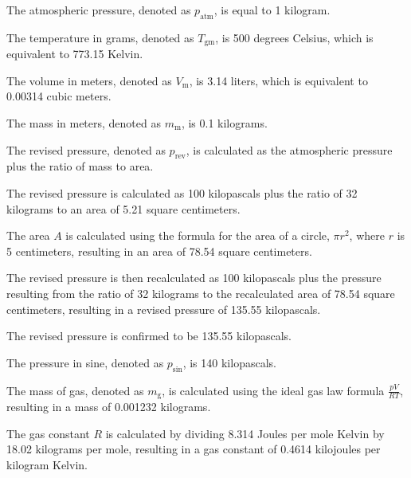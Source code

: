 The atmospheric pressure, denoted as \( p_{\text{atm}} \), is equal to 1 kilogram.

The temperature in grams, denoted as \( T_{\text{gm}} \), is 500 degrees Celsius, which is equivalent to 773.15 Kelvin.

The volume in meters, denoted as \( V_{\text{m}} \), is 3.14 liters, which is equivalent to 0.00314 cubic meters.

The mass in meters, denoted as \( m_{\text{m}} \), is 0.1 kilograms.

The revised pressure, denoted as \( p_{\text{rev}} \), is calculated as the atmospheric pressure plus the ratio of mass to area.

The revised pressure is calculated as 100 kilopascals plus the ratio of 32 kilograms to an area of 5.21 square centimeters.

The area \( A \) is calculated using the formula for the area of a circle, \( \pi r^2 \), where \( r \) is 5 centimeters, resulting in an area of 78.54 square centimeters.

The revised pressure is then recalculated as 100 kilopascals plus the pressure resulting from the ratio of 32 kilograms to the recalculated area of 78.54 square centimeters, resulting in a revised pressure of 135.55 kilopascals.

The revised pressure is confirmed to be 135.55 kilopascals.

The pressure in sine, denoted as \( p_{\text{sin}} \), is 140 kilopascals.

The mass of gas, denoted as \( m_{\text{g}} \), is calculated using the ideal gas law formula \( \frac{pV}{RT} \), resulting in a mass of 0.001232 kilograms.

The gas constant \( R \) is calculated by dividing 8.314 Joules per mole Kelvin by 18.02 kilograms per mole, resulting in a gas constant of 0.4614 kilojoules per kilogram Kelvin.